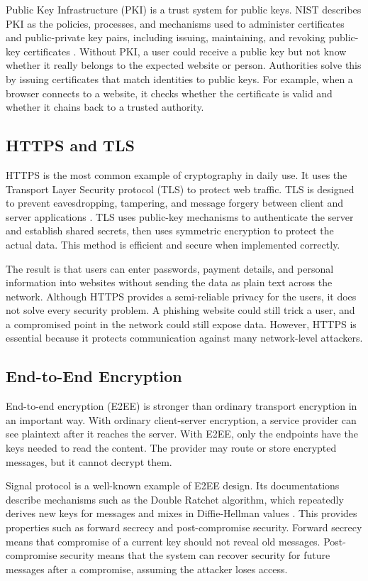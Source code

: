 \documentclass{easychair}
\begin{document}
Public Key Infrastructure (PKI) is a trust system for public keys. NIST describes PKI as the policies, processes, and mechanisms used to administer certificates and public-private key pairs, including issuing, maintaining, and revoking public-key certificates \cite{nist_pki}. Without PKI, a user could receive a public key but not know whether it really belongs to the expected website or person. Authorities solve this by issuing certificates that match identities to public keys. For example, when a browser connects to a website, it checks whether the certificate is valid and whether it chains back to a trusted authority.

\subsection{HTTPS and TLS}

HTTPS is the most common example of cryptography in daily use. It uses the Transport Layer Security protocol (TLS) to protect web traffic. TLS is designed to prevent eavesdropping, tampering, and message forgery between client and server applications \cite{ietf_tls13}. TLS uses public-key mechanisms to authenticate the server and establish shared secrets, then uses symmetric encryption to protect the actual data. This method is efficient and secure when implemented correctly.

The result is that users can enter passwords, payment details, and personal information into websites without sending the data as plain text across the network. Although HTTPS provides a semi-reliable privacy for the users, it does not solve every security problem. A phishing website could still trick a user, and a compromised point in the network could still expose data. However, HTTPS is essential because it protects communication against many network-level attackers.

\subsection{End-to-End Encryption}

End-to-end encryption (E2EE) is stronger than ordinary transport encryption in an important way. With ordinary client-server encryption, a service provider can see plaintext after it reaches the server. With E2EE, only the endpoints have the keys needed to read the content. The provider may route or store encrypted messages, but it cannot decrypt them.

Signal protocol is a well-known example of E2EE design. Its documentations describe mechanisms such as the Double Ratchet algorithm, which repeatedly derives new keys for messages and mixes in Diffie-Hellman values \cite{signal_protocol}. This provides properties such as forward secrecy and post-compromise security. Forward secrecy means that compromise of a current key should not reveal old messages. Post-compromise security means that the system can recover security for future messages after a compromise, assuming the attacker loses access.
\end{document}
